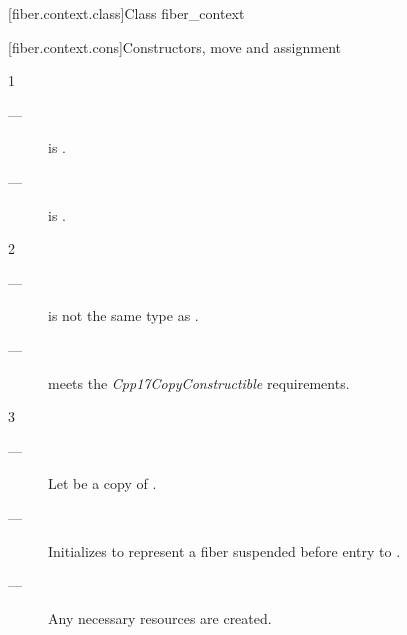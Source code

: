 
[fiber.context.class]{Class fiber\_context}


\newcommand{\state}{\cpp{state}}

[fiber.context.cons]{Constructors, move and assignment}


1 \mandates
\begin{description}
    \item[---]  is \true.
    \item[---]  is \true.
\end{description}

2 \constraints
\begin{description}
    \item[---]  is not the same type as \fiber.
    \item[---]  meets the \emph{Cpp17CopyConstructible} requirements.
\end{description}

3 \effects
\begin{description}
    \item[---] Let  be a copy of .
    \item[---] Initializes  to represent a fiber suspended before
              entry to .
    \item[---] Any necessary resources are created. 
\end{description}

